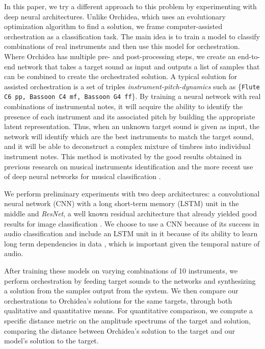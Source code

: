 \documentclass[runningheads,a4paper]{llncs}
\begin{document}
In this paper, we try a different approach to this problem by experimenting with deep neural architectures. Unlike Orchidea, which uses an evolutionary optimization algorithm to find a solution, we frame computer-assisted orchestration as a classification task. The main idea is to train a model to classify combinations of real instruments and then use this model for orchestration. Where Orchidea has multiple pre- and post-processing steps, we create an end-to-end network that takes a target sound as input and outputs a list of samples that can be combined to create the orchestrated solution. A typical solution for assisted orchestration is a set of triples \emph{instrument-pitch-dynamics} such as \{\texttt{Flute C6 pp, Bassoon C4 mf, Bassoon G4 ff}\}. By training a neural network with real combinations of instrumental notes, it will acquire the ability to identify the presence of each instrument and its associated pitch by building the appropriate latent representation. Thus, when an unknown target sound is given as input, the network will identify which are the best instruments to match the target sound, and it will be able to  deconstruct a complex mixture of timbres into individual instrument notes. This method is motivated by the good results obtained in previous research on musical instruments identification \cite{Benetos07, Kitahara05} and the more recent use of deep neural networks for musical classification \cite{lostanlen16, Bian19}.

We perform preliminary experiments with two deep architectures: a convolutional neural network (CNN) with a long short-term memory (LSTM) unit in the middle and \emph{ResNet}, a well known residual architecture that already yielded good results for image classification \cite{He15}. We choose to use a CNN because of its success in audio classification \cite{Hershey17} and include an LSTM unit in it because of its ability to learn long term dependencies in data \cite{Hochreiter97}, which is important given the temporal nature of audio.

After training these models on varying combinations of 10 instruments, we perform orchestration by feeding target sounds to the networks and synthesizing a solution from the samples output from the system. We then compare our orchestrations to Orchidea's solutions for the same targets, through both qualitative and quantitative means. For quantitative comparison, we compute a specific distance metric on the amplitude spectrums of the target and solution, comparing the distance between Orchidea's solution to the target and our model's solution to the target.
\end{document}
